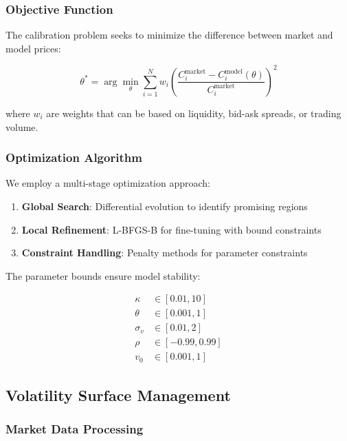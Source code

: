 \documentclass[12pt,a4paper]{article}
\begin{document}
\subsubsection{Objective Function}

The calibration problem seeks to minimize the difference between market and model prices:

\begin{equation}
\theta^* = \arg\min_\theta \sum_{i=1}^{N} w_i \left(\frac{C_i^{\text{market}} - C_i^{\text{model}}(\theta)}{C_i^{\text{market}}}\right)^2
\end{equation}

where $w_i$ are weights that can be based on liquidity, bid-ask spreads, or trading volume.

\subsubsection{Optimization Algorithm}

We employ a multi-stage optimization approach:

\begin{enumerate}
    \item \textbf{Global Search}: Differential evolution to identify promising regions
    \item \textbf{Local Refinement}: L-BFGS-B for fine-tuning with bound constraints
    \item \textbf{Constraint Handling}: Penalty methods for parameter constraints
\end{enumerate}

The parameter bounds ensure model stability:

\begin{align}
\kappa &\in [0.01, 10] \\
\theta &\in [0.001, 1] \\
\sigma_v &\in [0.01, 2] \\
\rho &\in [-0.99, 0.99] \\
v_0 &\in [0.001, 1]
\end{align}

\subsection{Volatility Surface Management}

\subsubsection{Market Data Processing}
\end{document}

